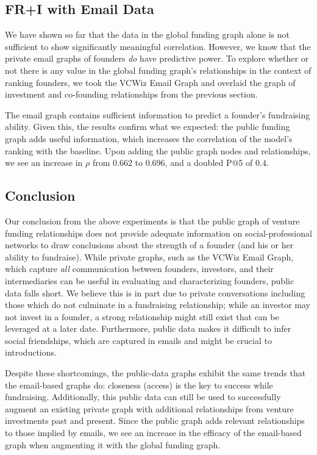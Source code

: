 \subsection{FR+I with Email Data}

We have shown so far that the data in the global funding graph alone is not sufficient to show significantly meaningful correlation. However, we know that the private email graphs of founders \textit{do} have predictive power. To explore whether or not there is any value in the global funding graph's relationships in the context of ranking founders, we took the VCWiz Email Graph and overlaid the graph of investment and co-founding relationships from the previous section.

The email graph contains sufficient information to predict a founder's fundraising ability. Given this, the results confirm what we expected: the public funding graph adds useful information, which increases the correlation of the model's ranking with the baseline. Upon adding the public graph nodes and relationships, we see an increase in $\rho$ from $0.662$ to $0.696$, and a doubled P@5 of $0.4$.

\subsection{Conclusion}

Our conclusion from the above experiments is that the public graph of venture funding relationships does not provide adequate information on social-professional networks to draw conclusions about the strength of a founder (and his or her ability to fundraise). While private graphs, such as the VCWiz Email Graph, which capture \textit{all} communication between founders, investors, and their intermediaries can be useful in evaluating and characterizing founders, public data falls short. We believe this is in part due to private conversations including those which do not culminate in a fundraising relationship; while an investor may not invest in a founder, a strong relationship might still exist that can be leveraged at a later date. Furthermore, public data makes it difficult to infer social friendships, which are captured in emails and might be crucial to introductions.

Despite these shortcomings, the public-data graphs exhibit the same trends that the email-based graphs do: closeness (access) is the key to success while fundraising. Additionally, this public data can still be used to successfully augment an existing private graph with additional relationships from venture investments past and present. Since the public graph adds relevant relationships to those implied by emails, we see an increase in the efficacy of the email-based graph when augmenting it with the global funding graph.
